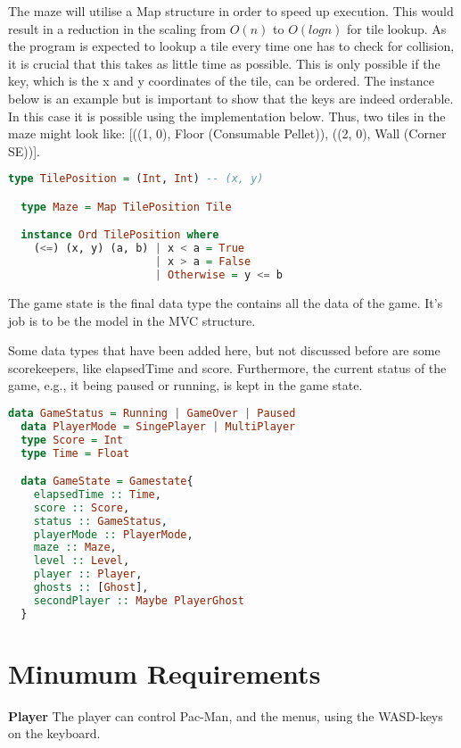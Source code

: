 \documentclass[11pt]{Article}
\begin{document}
The maze will utilise a Map structure in order to speed up execution. This would result in a reduction in the scaling from $O(n)$ to $O(logn)$ for tile lookup. As the program is expected to lookup a tile every time one has to check for collision, it is crucial that this takes as little time as possible. This is only possible if the key, which is the x and y coordinates of the tile, can be ordered. The instance below is an example but is important to show that the keys are indeed orderable. In this case it is possible using the implementation below. Thus, two tiles in the maze might look like: [((1, 0), Floor (Consumable Pellet)), ((2, 0), Wall (Corner SE))]. 

\begin{lstlisting}[language=Haskell]
  type TilePosition = (Int, Int) -- (x, y)

  type Maze = Map TilePosition Tile

  instance Ord TilePosition where 
    (<=) (x, y) (a, b) | x < a = True 
                       | x > a = False
                       | Otherwise = y <= b
\end{lstlisting}

\newpage
The game state is the final data type the contains all the data of the game. It's job is to be the model in the MVC structure. 

Some data types that have been added here, but not discussed before are some scorekeepers, like elapsedTime and score. Furthermore, the current status of the game, e.g., it being paused or running, is kept in the game state.
\begin{lstlisting}[language=Haskell]
  data GameStatus = Running | GameOver | Paused
  data PlayerMode = SingePlayer | MultiPlayer
  type Score = Int
  type Time = Float

  data GameState = Gamestate{
    elapsedTime :: Time,
    score :: Score,
    status :: GameStatus,
    playerMode :: PlayerMode,
    maze :: Maze, 
    level :: Level,
    player :: Player,
    ghosts :: [Ghost],
    secondPlayer :: Maybe PlayerGhost
  }
\end{lstlisting}


\section{Minumum Requirements} \label{ch:minumumRequirements}
\noindent \textbf{Player} The player can control Pac-Man, and the menus, using the WASD-keys on the keyboard.\\
\end{document}
